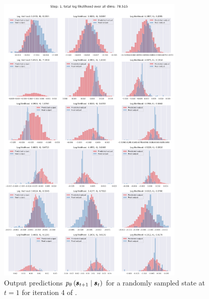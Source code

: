 \begin{figure}
    \centering
    \includegraphics[width=0.8\textwidth]{img/windyslope/output/windyslope_output_det2stoc2_dist_10_step1_iter4.png}
    \caption{Output predictions $\ptheta \protect\given*{\vns}{\vs}$ for a randomly sampled state at $t=1$ for iteration 4 of \dettostoc{}.}
    \label{fig:output_distribution_step1_posvel_dettostoc}
\end{figure}%
